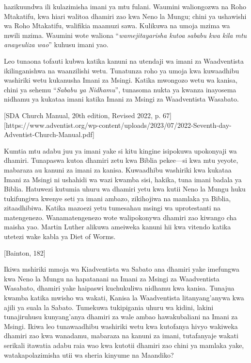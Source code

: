  hazikuundwa ili kulazimisha imani ya mtu fulani. Waumini waliongozwa na Roho Mtakatifu, kwa hiari walitoa dhamiri zao kwa Neno la Mungu; chini ya ushawishi wa Roho Mtakatifu, walifikia maamuzi sawa. Kulikuwa na umoja mzima wa mwili mzima. Waumini wote waliona “\textit{wamejitayarisha kutoa sababu kwa kila mtu anayeuliza wao}” kuhusu imani yao.

Leo tunaona tofauti kubwa katika kanuni na utendaji wa imani za Waadventista ikilinganishwa na waanzilishi wetu. Tunatunza roho ya umoja kwa kuwaadhibu washiriki wetu kukanusha Imani za Msingi. Katika mwongozo wetu wa kanisa, chini ya sehemu “\textit{Sababu ya Nidhamu}”, tunasoma nukta ya kwanza inayosema nidhamu ya kukataa imani katika Imani za Msingi za Waadventista Wasabato.


[SDA Church Manual, 20th edition, Revised 2022, p. 67][https://www.adventist.org/wp-content/uploads/2023/07/2022-Seventh-day-Adventist-Church-Manual.pdf]

Kumtia mtu adabu juu ya imani yake si kitu kingine isipokuwa upokonyaji wa dhamiri. Tunapaswa kutoa dhamiri zetu kwa Biblia pekee—si kwa mtu yeyote, mabaraza au kanuni za imani za kanisa. Kuwaadhibu washiriki kwa kukataa Imani za Msingi ni ushahidi wa wazi kwamba sisi, hakika, tuna imani badala ya Biblia. Hatuwezi kutumia uhuru wa dhamiri yetu kwa kutii Neno la Mungu huku tukifungiwa kwenye seti ya imani ambazo, zikihojiwa na mamlaka ya Biblia, zitaadhibiwa. Katika mazoezi yetu tumesahau msingi wa uprotestanti na matengenezo. Wanamatengenezo wote walipokonywa dhamiri zao kiwango cha maisha yao. Martin Luther alikuwa ameiweka kanuni hii kwa vitendo katika utetezi wake kabla ya Diet of Worms.

[Bainton, 182]

Ikiwa mshiriki mmoja wa Kiadventista wa Sabato ana dhamiri yake imefungwa kwa Neno la Mungu na hapatanani na Imani za Msingi za Waadventista Wasabato, dhamiri yake haipaswi kuchukuliwa nidhamu kwa kanisa. Tunajua kwamba katika mwisho wa wakati, Kanisa la Waadventista litanyang'anywa kwa ajili ya suala la Sabato. Tumekuwa tukipigania uhuru wa kidini, lakini tunajiruhusu kunyang'anya dhamiri za wale ambao hawakubaliani na Imani za Msingi. Ikiwa leo tunawaadhibu washiriki wetu kwa kutofanya hivyo wakiweka dhamiri zao kwa wanadamu, mabaraza na kanuni za imani, tutafanyaje wakati serikali itawatia adabu raia wao kwa kutotii dhamiri zao chini ya mamlaka yake, watakapolazimisha utii wa sheria kinyume na Maandiko?

